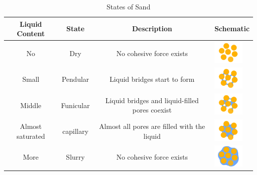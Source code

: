 \documentclass[12pt]{article}
\begin{document}
\begin{table}[H]
    \caption{States of Sand}
    \vspace{10pt}
    \centering
    \begin{tabular}{cccl}
        \hline
        Liquid Content   & State     & Description                                    & Schematic                  \\
        \hline
        No               & Dry       & No cohesive force exists                       & \begin{minipage}{0.5\textwidth}
            \includegraphics[width=1.5cm, height=1.125cm]{s1.png}
        \end{minipage}  \\
        Small            & Pendular  & Liquid bridges start to form                   & \begin{minipage}{0.1\textwidth}
            \includegraphics[width=1.5cm, height=1.125cm]{s2.png}
        \end{minipage} \\
        Middle           & Funicular & Liquid bridges and liquid-filled pores coexist & \begin{minipage}{0.1\textwidth}
            \includegraphics[width=1.5cm, height=1.125cm]{s3.png}
        \end{minipage} \\
        Almost saturated & capillary & Almost all pores are filled with the liquid    & \begin{minipage}{0.1\textwidth}
            \includegraphics[width=1.5cm, height=1.125cm]{s4.png}
        \end{minipage} \\
        More             & Slurry    & No cohesive force exists                       & \begin{minipage}{0.1\textwidth}
            \includegraphics[width=1.5cm, height=1.125cm]{s5.png}
        \end{minipage} \\
        \hline
    \end{tabular}
    \label{bs2}
\end{table}
\end{document}
